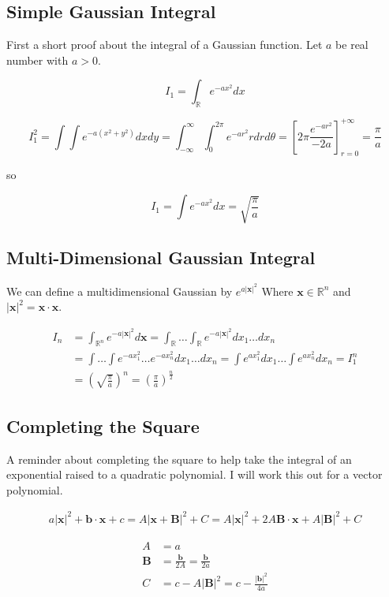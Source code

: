 \documentclass[12pt]{article}
\newcommand{\bv}[1]{\boldsymbol{#1}}
\begin{document}
\subsection{Simple Gaussian Integral}

First a short proof about the integral of a Gaussian function. Let $a$ be real number with $a>0$.

\[
I_1 = \int_{\mathbb{R}} e^{-a x^2} dx
\]

\[
I_1^2 = \int \int e^{-a (x^2+y^2)} dx dy = \int_{-\infty}^{\infty} \int_0^{2\pi} e^{-a r^2} r dr d\theta = \left[2 \pi \frac{e^{-a r^2}}{-2a} \right]_{r=0}^{+\infty} = \frac{\pi}{a}
\]

so

\[ I_1 = \int e^{-a x^2}dx = \sqrt{\frac{\pi}{a}} \]

\subsection{Multi-Dimensional Gaussian Integral}

We can define a multidimensional Gaussian by $e^{a |\bv{x}|^2}$ Where $\bv{x} \in \mathbb{R}^n$ and $|\bv{x}|^2 = \bv{x} \cdot \bv{x}$.

\begin{align}
I_n &= \int_{\mathbb{R}^n} e^{-a|\bv{x}|^2} d\bv{x} = \int_{\mathbb{R}} \ldots \int_{\mathbb{R}} e^{-a|\bv{x}|^2} dx_1 \ldots dx_n\\
&= \int \ldots \int e^{-ax_1^2}\ldots e^{-ax_n^2} dx_1 \ldots dx_n = \int e^{a x_1^2} dx_1 \ldots \int e^{a x_n^2} dx_n = I_1^n\\
&= \left(\sqrt{\frac{\pi}{a}}\right)^n = \left(\frac{\pi}{a}\right)^{\frac{n}{2}}
\end{align}

\subsection{Completing the Square}
A reminder about completing the square to help take the integral of an exponential raised to a quadratic polynomial. I will work this out for a vector polynomial.

\begin{align}
a|\bv{x}|^2 + \bv{b}\cdot\bv{x} + c = A|\bv{x}+\bv{B}|^2+C = A|\bv{x}|^2+2A\bv{B}\cdot\bv{x} + A|\bv{B}|^2 + C
\end{align}

\begin{align}
A &= a\\
\bv{B} &= \frac{\bv{b}}{2A} = \frac{\bv{b}}{2a}\\
C &= c - A|\bv{B}|^2 = c - \frac{|\bv{b}|^2}{4a}
\end{align}
 
\end{document}
